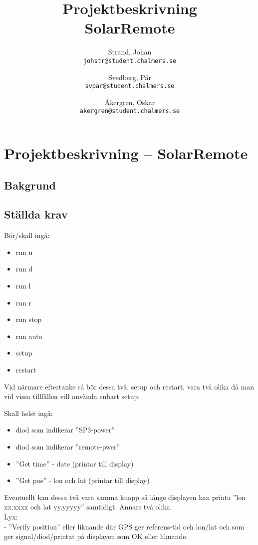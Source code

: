 \documentclass{article}
\author{	Strand, Johan \\ \texttt{johstr@student.chalmers.se} \and
			Svedberg, Pär\\ \texttt{svpar@student.chalmers.se} \and
			Åkergren, Oskar\\ \texttt{akergren@student.chalmers.se}
}
\title{Projektbeskrivning  \\ SolarRemote}
\begin{document}
\section*{Projektbeskrivning -- SolarRemote} %
\label{sec:projekt}

	\subsection*{Bakgrund} %
	\label{sub:bakgrund}


	\subsection*{Ställda krav} %
	\label{sub:stallda_krav}

	
		\noindent Bör/skall ingå:
		\begin{itemize}
			\item run u
			\item run d
			\item run l
			\item run r
			\item run stop
			\item run auto
			\item setup
			\item restart 
		\end{itemize}

	\noindent Vid närmare eftertanke så bör dessa två, setup och restart, vara två olika då man vid vissa tillfällen vill använda enbart setup.


	\noindent Skall helst ingå:
	\begin{itemize}
		\item  diod som indikerar ”SP3-power”
		\item  diod som indikerar ”remote-pwer”
		\item  ”Get time” - date (printar till display)
		\item  ”Get pos” - lon och lat (printar till display)
	\end{itemize}

	\noindent Eventuellt kan dessa två vara samma knapp så länge displayen kan printa ”lon xx.xxxx och lat yy.yyyyy” samtidigt. Annars två	 olika. \\

	\noindent Lyx: \\
	-	”Verify position” eller liknande där GPS ger referens-tid och lon/lat och som ger signal/diod/printat på displayen som OK eller liknande. \\
\end{document}
